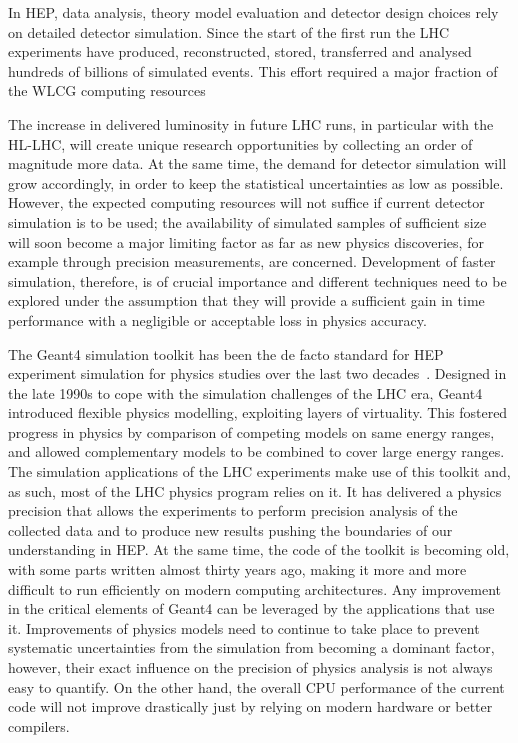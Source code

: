 \documentclass[11pt,a4paper]{article}
\begin{document}
In HEP, data analysis, theory model evaluation and detector design
choices rely on detailed detector simulation. Since the start of the
first run the LHC experiments have produced, reconstructed, stored,
transferred and analysed hundreds of billions of simulated events. This
effort required a major fraction of the WLCG computing 
resources~\cite{ALICE-TDR-12, ATLAS-TDR-17, CMS-TDR-7, LHCb-TDR-11, WLCG-CM-Update, 
ALICE-TDR-019, LHCb-TDR-018, ATLAS-LHCC-2019-02, CMS-LHCC-2019-09}

The increase in delivered luminosity in future LHC runs, in particular
with the HL-LHC, will create unique research opportunities by collecting
an order of magnitude more data. At the same time, the demand for
detector simulation will grow accordingly, in order to keep the
statistical uncertainties as low as possible. However, the expected
computing resources will not suffice if current detector simulation is
to be used; the availability of simulated samples of sufficient size
will soon become a major limiting factor as far as new physics
discoveries, for example through precision measurements, are concerned.
Development of faster simulation, therefore, is of crucial importance
and different techniques need to be explored under the assumption that
they will provide a sufficient gain in time performance with a
negligible or acceptable loss in physics accuracy.

The Geant4 simulation toolkit has been the de facto standard for HEP
experiment simulation for physics studies over the last two decades~\cite{Geant4-2003, Geant4-2006, Geant4-2016}.
Designed in the late 1990s to cope with the simulation challenges of the
LHC era, Geant4 introduced flexible physics modelling, exploiting layers
of virtuality. This fostered progress in physics by comparison of
competing models on same energy ranges, and allowed complementary models
to be combined to cover large energy ranges. The simulation applications
of the LHC experiments make use of this toolkit and, as such, most of
the LHC physics program relies on it. It has delivered a physics
precision that allows the experiments to perform precision analysis of
the collected data and to produce new results pushing the boundaries of
our understanding in HEP. At the same time, the code of the toolkit is
becoming old, with some parts written almost thirty years ago, making it
more and more difficult to run efficiently on modern computing
architectures. Any improvement in the critical elements of Geant4 can be
leveraged by the applications that use it. 
Improvements of physics models need to continue to take place to prevent
systematic uncertainties from the simulation from becoming a dominant
factor, however, their exact influence on the precision of physics
analysis is not always easy to quantify. On the other hand, the overall
CPU performance of the current code will not improve drastically just by
relying on modern hardware or better compilers. 
\end{document}
